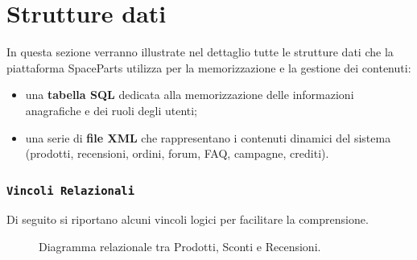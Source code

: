 \documentclass[a4paper,12pt]{report}
\begin{document}
\section{Strutture dati}
\label{sec:strutture-dati}

In questa sezione verranno illustrate nel dettaglio tutte le strutture dati che
la piattaforma SpaceParts utilizza per la memorizzazione e la gestione dei
contenuti:

\begin{itemize}
    \item una \textbf{tabella SQL} dedicata alla memorizzazione delle informazioni
          anagrafiche e dei ruoli degli utenti;
    \item una serie di \textbf{file XML} che rappresentano i contenuti dinamici
          del sistema (prodotti, recensioni, ordini, forum, FAQ, campagne, crediti).
\end{itemize}


\subsubsection{\texttt{Vincoli Relazionali}}

Di seguito si riportano alcuni vincoli logici per facilitare la comprensione.

\begin{figure}[h!]
\centering


\caption{Diagramma relazionale tra Prodotti, Sconti e Recensioni.}
\label{fig:er}
\end{figure}
\end{document}
